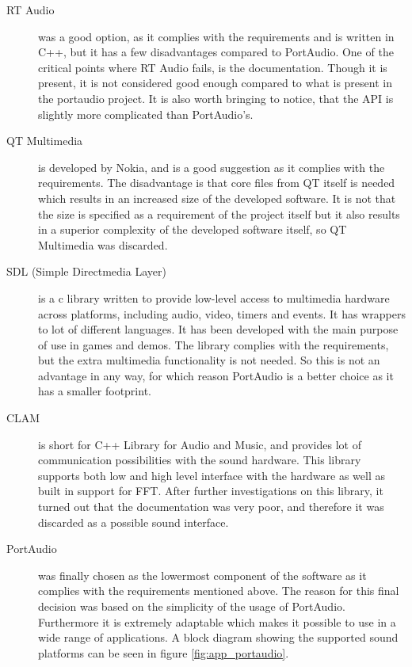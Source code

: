 \begin{description}
\item[RT Audio\footnotemark] was a good option, as it complies with the requirements and is written in C++, but it has a few disadvantages compared to PortAudio. One of the critical points where RT Audio fails, is the documentation. Though it is present, it is not considered good enough compared to what is present in the portaudio project. It is also worth bringing to notice, that the API is slightly more complicated than PortAudio's.

\item[QT Multimedia\footnotemark] is developed by Nokia, and is a good suggestion as it complies with the requirements. The disadvantage is that core files from QT itself is needed which results in an increased size of the developed software. It is not that the size is specified as a requirement of the project itself but it also results in a superior complexity of the developed software itself, so QT Multimedia was discarded.

\item[SDL (Simple Directmedia Layer)\footnotemark]
 is a c library written to provide low-level access to multimedia hardware across platforms, including audio, video, timers and events. It has wrappers to lot of different languages. It has been developed with the main purpose of use in games and demos. The library complies with the requirements, but the extra multimedia functionality is not needed. So this is not an advantage in any way, for which reason PortAudio is a better choice as it has a smaller footprint.

\item[CLAM\footnotemark] is short for C++ Library for Audio and Music, and provides lot of communication possibilities with the sound hardware. This library supports both low and high level interface with the hardware as well as built in support for FFT. After further investigations on this library, it turned out that the documentation was very poor, and therefore it was discarded as a possible sound interface.

\item[PortAudio\footnotemark] was finally chosen as the lowermost component of the software as it complies with the requirements mentioned above.  The reason for this final decision was based on the simplicity of the usage of PortAudio. Furthermore it is extremely adaptable which makes it possible to use in a wide range of applications. A block diagram showing the supported sound platforms can be seen in figure \ref{fig:app_portaudio}.
\end{description}

